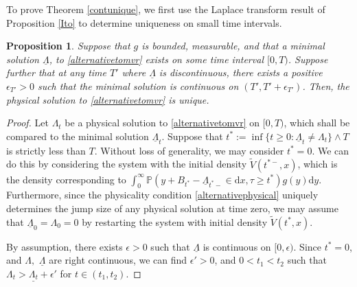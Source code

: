 \documentclass[11pt]{article}
\theoremstyle{plain}
\newtheorem{proposition}[theorem]{Proposition}
\theoremstyle{remark}
\theoremstyle{definition}
\numberwithin{equation}{section}
\begin{document}
To prove Theorem \ref{contunique}, we first use the Laplace transform result of Proposition \ref{Ito} to determine uniqueness on small time intervals. 
\begin{proposition}
\label{uniquecont}
    Suppose that $g$ is bounded, measurable, and that a minimal solution $\underline{\Lambda}$, to \eqref{alternativetomvr} exists on some time interval $[0,T)$. Suppose further that at any time $T'$ where $\underline{\Lambda}$ is discontinuous, there exists a positive $\epsilon_{T'}>0$ such that the minimal solution is continuous on $(T',T'+\epsilon_{T'})$. Then, the physical solution to \eqref{alternativetomvr} is unique.  
\end{proposition}
\begin{proof}
Let $\Lambda_t$ be a physical solution to \eqref{alternativetomvr} on $[0,T)$, which shall be compared to the minimal solution $\underline{\Lambda}_t$. Suppose that $t^*:=\inf\{t\geq 0:\underline{\Lambda}_{t}\neq \Lambda_{t}\}\wedge T$ is strictly less than $T$. Without loss of generality, we may consider $t^*=0$. We can do this by considering the system with the initial density $\tilde V(t^{*-},x)$, which is the density corresponding to $\int_0^\infty \mathbb{P}(y+B_{t^*}-\underline{\Lambda}_{t^*-}\in \textrm{d}x,\tau\geq t^*)g(y)\textrm{d}y$. Furthermore, since the physicality condition \eqref{alternativephysical} uniquely determines the jump size of any physical solution at time zero, we may assume that $\underline{\Lambda}_0=\Lambda_0=0$ by restarting the system with initial density $\tilde V(t^*,x)$. 

By assumption, there exists $\epsilon>0$ such that $\underline{\Lambda}$ is continuous on $[0,\epsilon)$. Since $t^*=0$, and $\Lambda,$ $\underline{\Lambda}$ are right continuous, we can find $\epsilon'>0$, and $0<t_1<t_2$ such that $\Lambda_{t}>\underline{\Lambda_t}+\epsilon'$ for $t\in(t_1,t_2)$.


\end{proof}
\end{document}
